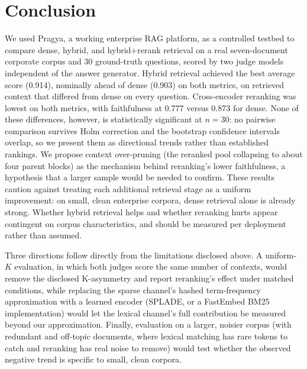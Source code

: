 \documentclass[conference]{IEEEtran}
\begin{document}
\section{Conclusion}
We used Pragya, a working enterprise RAG platform, as a controlled testbed to
compare dense, hybrid, and hybrid$+$rerank retrieval on a real seven-document
corporate corpus and 30 ground-truth questions, scored by two judge models
independent of the answer generator. Hybrid retrieval achieved the best average
score (0.914), nominally ahead of dense (0.903) on both metrics, on retrieved
context that differed from dense on every question. Cross-encoder reranking was
lowest on both metrics, with faithfulness at 0.777 versus 0.873 for dense. None of
these differences, however, is statistically significant at $n=30$: no pairwise
comparison survives Holm correction and the bootstrap confidence intervals
overlap, so we present them as directional trends rather than established
rankings. We propose context over-pruning (the reranked pool collapsing to about
four parent blocks) as the mechanism behind reranking's lower faithfulness, a
hypothesis that a larger sample would be needed to confirm. These results caution
against treating each additional retrieval stage as a uniform improvement: on
small, clean enterprise corpora, dense retrieval alone is already strong. Whether
hybrid retrieval helps and whether reranking hurts appear contingent on corpus
characteristics, and should be measured per deployment rather than assumed.

Three directions follow directly from the limitations disclosed above. A
uniform-$K$ evaluation, in which both judges score the same number of contexts,
would remove the disclosed K-asymmetry and report reranking's effect under
matched conditions, while replacing the sparse channel's hashed term-frequency
approximation with a learned encoder (SPLADE, or a FastEmbed BM25
implementation) would let the lexical channel's full contribution be measured
beyond our approximation. Finally, evaluation
on a larger, noisier corpus (with redundant and off-topic documents, where
lexical matching has rare tokens to catch and reranking has real noise to
remove) would test whether the observed negative trend is specific to small,
clean corpora.



\end{document}
